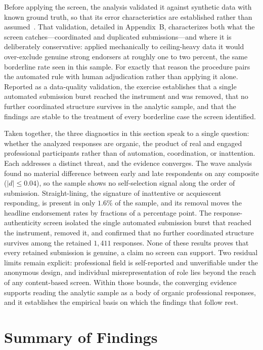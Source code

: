 Before applying the screen, the analysis validated it against synthetic data with known ground truth, so that its error characteristics are established rather than assumed~\parencite{Fawcett_ROC_2006, Ilagan_ModelAgnostic_2023, Dupuis_Indices_2019}. That validation, detailed in Appendix~B, characterizes both what the screen catches---coordinated and duplicated submissions---and where it is deliberately conservative: applied mechanically to ceiling-heavy data it would over-exclude genuine strong endorsers at roughly one to two percent, the same borderline rate seen in this sample. For exactly that reason the procedure pairs the automated rule with human adjudication rather than applying it alone. Reported as a data-quality validation, the exercise establishes that a single automated submission burst reached the instrument and was removed, that no further coordinated structure survives in the analytic sample, and that the findings are stable to the treatment of every borderline case the screen identified.

Taken together, the three diagnostics in this section speak to a single question: whether the analyzed responses are organic, the product of real and engaged professional participants rather than of automation, coordination, or inattention. Each addresses a distinct threat, and the evidence converges. The wave analysis found no material difference between early and late respondents on any composite ($|d| \leq 0.04$), so the sample shows no self-selection signal along the order of submission. Straight-lining, the signature of inattentive or acquiescent responding, is present in only $1.6\%$ of the sample, and its removal moves the headline endorsement rates by fractions of a percentage point. The response-authenticity screen isolated the single automated submission burst that reached the instrument, removed it, and confirmed that no further coordinated structure survives among the retained $1{,}411$ responses. None of these results proves that every retained submission is genuine, a claim no screen can support. Two residual limits remain explicit: professional field is self-reported and unverifiable under the anonymous design, and individual misrepresentation of role lies beyond the reach of any content-based screen. Within those bounds, the converging evidence supports reading the analytic sample as a body of organic professional responses, and it establishes the empirical basis on which the findings that follow rest.

\section{Summary of Findings}

